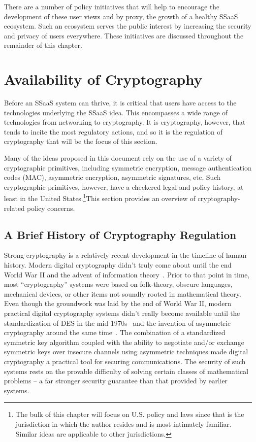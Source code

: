 There are a number of policy initiatives that will help to encourage
the development of these user views and by proxy, the growth of a
healthy SSaaS ecosystem. Such an ecosystem serves the public interest
by increasing the security and privacy of users everywhere. These
initiatives are discussed throughout the remainder of this chapter.

\section{Availability of Cryptography}
\label{chap:policy:crypto}

Before an SSaaS system can thrive, it is critical that users have
access to the technologies underlying the SSaaS idea. This encompasses
a wide range of technologies from networking to cryptography. It is
cryptography, however, that tends to incite the most regulatory
actions, and so it is the regulation of cryptography that will be the
focus of this section.

Many of the ideas proposed in this document rely on the use of a
variety of cryptographic primitives, including symmetric encryption,
message authentication codes (MAC), asymmetric encryption, asymmetric
signatures, etc. Such cryptographic primitives, however, have a
checkered legal and policy history, at least in the United
States.\footnote{The bulk of this chapter will focus on U.S. policy and
  laws since that is the jurisdiction in which the author resides and
  is most intimately familiar. Similar ideas are applicable to other
  jurisdictions.}This section provides an overview of
cryptography-related policy concerns.

\subsection{A Brief History of Cryptography Regulation}

Strong cryptography is a relatively recent development in the timeline
of human history. Modern digital cryptography didn't truly come about
until the end World War II and the advent of information
theory~\cite{shannon1945}. Prior to that point in time, most
``cryptography'' systems were based on folk-theory, obscure languages,
mechanical devices, or other items not soundly rooted in mathematical
theory. Even though the groundwork was laid by the end of World War
II, modern practical digital cryptography systems didn't really become
available until the standardization of DES in the mid
1970s~\cite{fips46} and the invention of asymmetric cryptography
around the same time~\cite{diffie1976}. The combination of a
standardized symmetric key algorithm coupled with the ability to
negotiate and/or exchange symmetric keys over insecure channels using
asymmetric techniques made digital cryptography a practical tool for
securing communications. The security of such systems rests on the
provable difficulty of solving certain classes of mathematical
problems -- a far stronger security guarantee than that provided by
earlier systems.

